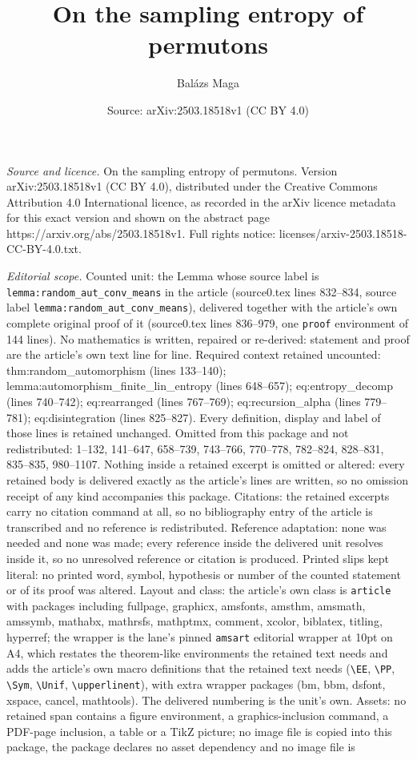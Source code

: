 \documentclass[10pt,a4paper]{amsart}
\title[On the sampling entropy of permutons]{On the sampling entropy of permutons}
\author{Bal\'azs Maga}
\date{Source: arXiv:2503.18518v1 (CC BY 4.0)}
\begin{document}
\maketitle

\noindent\emph{Source and licence.} On the sampling entropy of permutons. Version arXiv:2503.18518v1 (CC BY 4.0), distributed under the Creative Commons Attribution 4.0 International licence, as recorded in the arXiv licence metadata for this exact version and shown on the abstract page https://arxiv.org/abs/2503.18518v1. Full rights notice: licenses/arxiv-2503.18518-CC-BY-4.0.txt.\par\smallskip

\noindent\textit{Editorial scope.} Counted unit: the Lemma whose source label is \texttt{lemma:random\_aut\_conv\_means} in the article (source0.tex lines 832--834, source label \texttt{lemma:random\_aut\_conv\_means}), delivered together with the article's own complete original proof of it (source0.tex lines 836--979, one \texttt{proof} environment of 144 lines). No mathematics is written, repaired or re-derived: statement and proof are the article's own text line for line. Required context retained uncounted: thm:random\_automorphism (lines 133--140); lemma:automorphism\_finite\_lin\_entropy (lines 648--657); eq:entropy\_decomp (lines 740--742); eq:rearranged (lines 767--769); eq:recursion\_alpha (lines 779--781); eq:disintegration (lines 825--827). Every definition, display and label of those lines is retained unchanged. Omitted from this package and not redistributed: 1--132, 141--647, 658--739, 743--766, 770--778, 782--824, 828--831, 835--835, 980--1107. Nothing inside a retained excerpt is omitted or altered: every retained body is delivered exactly as the article's lines are written, so no omission receipt of any kind accompanies this package. Citations: the retained excerpts carry no citation command at all, so no bibliography entry of the article is transcribed and no reference is redistributed. Reference adaptation: none was needed and none was made; every reference inside the delivered unit resolves inside it, so no unresolved reference or citation is produced. Printed slips kept literal: no printed word, symbol, hypothesis or number of the counted statement or of its proof was altered. Layout and class: the article's own class is \texttt{article} with packages including fullpage, graphicx, amsfonts, amsthm, amsmath, amssymb, mathabx, mathrsfs, mathptmx, comment, xcolor, biblatex, titling, hyperref; the wrapper is the lane's pinned \texttt{amsart} editorial wrapper at 10pt on A4, which restates the theorem-like environments the retained text needs and adds the article's own macro definitions that the retained text needs (\texttt{\textbackslash EE}, \texttt{\textbackslash PP}, \texttt{\textbackslash Sym}, \texttt{\textbackslash Unif}, \texttt{\textbackslash upperlinent}), with extra wrapper packages (bm, bbm, dsfont, xspace, cancel, mathtools). The delivered numbering is the unit's own. Assets: no retained span contains a figure environment, a graphics-inclusion command, a PDF-page inclusion, a table or a TikZ picture; no image file is copied into this package, the package declares no asset dependency and no image file is 
\end{document}
